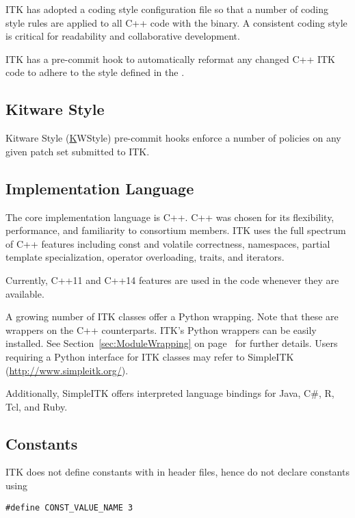 ITK has adopted a  coding style configuration file so
that a number of coding style rules are applied to all C++ code with the
 binary. A consistent coding style is critical for
readability and collaborative development.

ITK has a pre-commit hook to automatically reformat any changed C++ ITK code
to adhere to the style defined in the .


\subsection{Kitware Style}
\label{subsec:KWStyle}

Kitware Style (\href{https://kitware.github.io/KWStyle/} KWStyle) pre-commit
hooks enforce a number of policies on any given patch set submitted to ITK.


\subsection{Implementation Language}
\label{subsec:ImplementationLanguage}

The core implementation language is C++. C++ was chosen for its flexibility,
performance, and familiarity to consortium members. ITK uses the full spectrum
of C++ features including const and volatile correctness, namespaces, partial
template specialization, operator overloading, traits, and iterators.

Currently, C++11 and C++14 features are used in the code whenever they are
available.

A growing number of ITK classes offer a Python wrapping. Note that these are
wrappers on the C++ counterparts. ITK's Python wrappers can be easily installed.
See Section~\ref{sec:ModuleWrapping} on page~\pageref{sec:ModuleWrapping} for
further details. Users requiring a Python interface for ITK classes may refer to
SimpleITK (\href{http://www.simpleitk.org/}{http://www.simpleitk.org/}).

Additionally, SimpleITK offers interpreted language bindings for Java, C\#, R,
Tcl, and Ruby.


\subsection{Constants}
\label{subsec:Constants}

ITK does not define constants with  in header files, hence do not
declare constants using
\small
\begin{verbatim}
#define CONST_VALUE_NAME 3
\end{verbatim}
\normalsize

